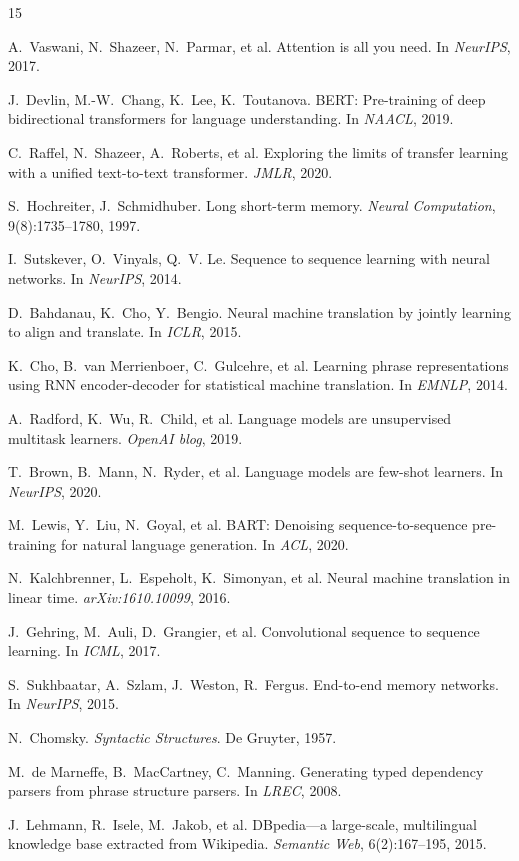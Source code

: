\documentclass[10pt]{article}
\begin{document}
\begin{thebibliography}{15}

A.~Vaswani, N.~Shazeer, N.~Parmar, et al. Attention is all you need. In \emph{NeurIPS}, 2017.

J.~Devlin, M.-W.~Chang, K.~Lee, K.~Toutanova. BERT: Pre-training of deep bidirectional transformers for language understanding. In \emph{NAACL}, 2019.

C.~Raffel, N.~Shazeer, A.~Roberts, et al. Exploring the limits of transfer learning with a unified text-to-text transformer. \emph{JMLR}, 2020.

S.~Hochreiter, J.~Schmidhuber. Long short-term memory. \emph{Neural Computation}, 9(8):1735--1780, 1997.

I.~Sutskever, O.~Vinyals, Q.~V. Le. Sequence to sequence learning with neural networks. In \emph{NeurIPS}, 2014.

D.~Bahdanau, K.~Cho, Y.~Bengio. Neural machine translation by jointly learning to align and translate. In \emph{ICLR}, 2015.

K.~Cho, B.~van Merrienboer, C.~Gulcehre, et al. Learning phrase representations using RNN encoder-decoder for statistical machine translation. In \emph{EMNLP}, 2014.

A.~Radford, K.~Wu, R.~Child, et al. Language models are unsupervised multitask learners. \emph{OpenAI blog}, 2019.

T.~Brown, B.~Mann, N.~Ryder, et al. Language models are few-shot learners. In \emph{NeurIPS}, 2020.

M.~Lewis, Y.~Liu, N.~Goyal, et al. BART: Denoising sequence-to-sequence pre-training for natural language generation. In \emph{ACL}, 2020.

N.~Kalchbrenner, L.~Espeholt, K.~Simonyan, et al. Neural machine translation in linear time. \emph{arXiv:1610.10099}, 2016.

J.~Gehring, M.~Auli, D.~Grangier, et al. Convolutional sequence to sequence learning. In \emph{ICML}, 2017.

S.~Sukhbaatar, A.~Szlam, J.~Weston, R.~Fergus. End-to-end memory networks. In \emph{NeurIPS}, 2015.

N.~Chomsky. \emph{Syntactic Structures}. De Gruyter, 1957.

M.~de Marneffe, B.~MacCartney, C.~Manning. Generating typed dependency parsers from phrase structure parsers. In \emph{LREC}, 2008.

J.~Lehmann, R.~Isele, M.~Jakob, et al. DBpedia---a large-scale, multilingual knowledge base extracted from Wikipedia. \emph{Semantic Web}, 6(2):167--195, 2015.

\end{thebibliography}
\end{document}
